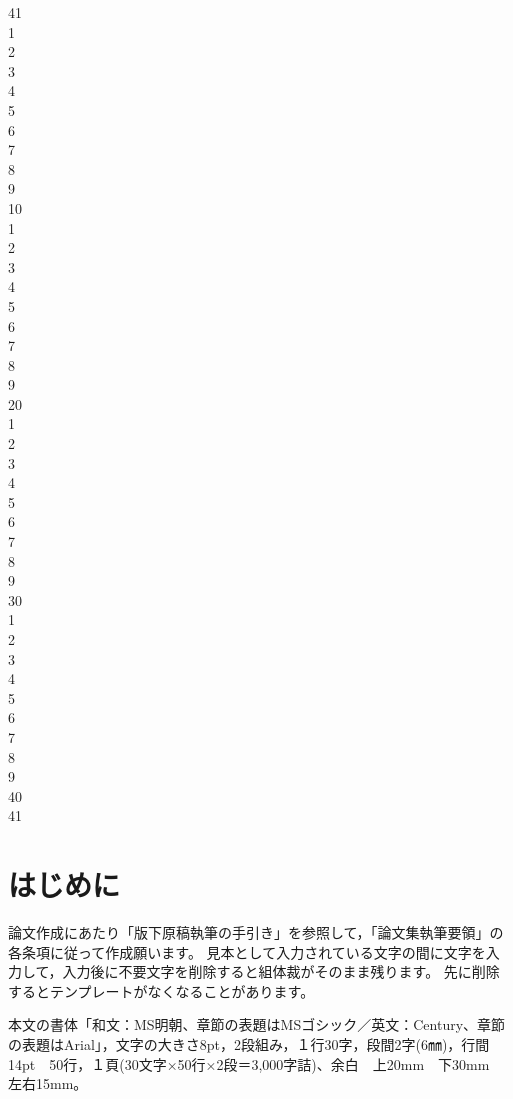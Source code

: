 \documentclass[base=11pt,magstyle=real,a4paper,twocolumn,xelatex,pandoc,jafont=ms]{bxjsarticle}
\begin{document}
41\\
1\\2\\3\\4\\5\\6\\7\\8\\9\\10\\
1\\2\\3\\4\\5\\6\\7\\8\\9\\20\\
1\\2\\3\\4\\5\\6\\7\\8\\9\\30\\
1\\2\\3\\4\\5\\6\\7\\8\\9\\40\\
41\\

\section{はじめに}
	論文作成にあたり「版下原稿執筆の手引き」を参照して，「論文集執筆要領」の各条項に従って作成願います。
	見本として入力されている文字の間に文字を入力して，入力後に不要文字を削除すると組体裁がそのまま残ります。
	先に削除するとテンプレートがなくなることがあります。
	
	本文の書体「和文：MS明朝、章節の表題はMSゴシック／英文：Century、章節の表題はArial」，文字の大きさ8pt，2段組み，１行30字，段間2字(6㎜)，行間14pt　50行，１頁(30文字×50行×2段＝3,000字詰)、余白　上20mm　下30mm　左右15mm。
\end{document}
